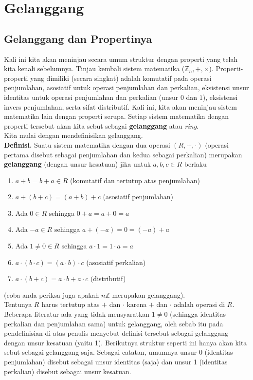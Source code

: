 \chapter{Gelanggang}
	\section{Gelanggang dan Propertinya}
	Kali ini kita akan meninjau secara umum struktur dengan properti yang telah kita kenali sebelumnya. Tinjau kembali sistem matematika ($\mathbb{Z}_n,+,\times$). Properti-properti yang dimiliki (secara singkat) adalah komutatif pada operasi penjumlahan, asosiatif untuk operasi penjumlahan dan perkalian, eksistensi unsur identitas untuk operasi penjumlahan dan perkalian (unsur $0$ dan $1$), eksistensi invers penjumlahan, serta sifat distributif. Kali ini, kita akan meninjau sistem matematika lain dengan properti serupa. Setiap sistem matematika dengan properti tersebut akan kita sebut sebagai \textbf{gelanggang} atau \textit{ring}.
	\\
	
	Kita mulai dengan mendefinisikan gelanggang.
	\\
	
	\textbf{Definisi. }Suatu sistem matematika dengan dua operasi $(R,+,\cdot)$ (operasi pertama disebut sebagai penjumlahan dan kedua sebagai perkalian) merupakan \textbf{gelanggang} (dengan unsur kesatuan) jika untuk $a,b,c \in R$ berlaku
	\begin{enumerate}
		\item $a + b = b + a \in R$ (komutatif dan tertutup atas penjumlahan)
		\item $a + (b + c) = (a + b) + c$ (asosiatif penjumlahan)
		\item Ada $0 \in R$ sehingga $0 + a = a + 0 = a$
		\item Ada $-a \in R$ sehingga $a + (-a) = 0 = (-a) + a$
		\item Ada $1 \ne 0 \in R$ sehingga $a \cdot 1 = 1 \cdot a = a$
		\item $a \cdot (b \cdot c) = (a \cdot b) \cdot c$ (asosiatif perkalian)
		\item $a \cdot (b + c) = a \cdot b + a \cdot c$ (distributif)
	\end{enumerate}
	(coba anda periksa juga apakah $n\mathbb{Z}$ merupakan gelanggang).\\
	
	Tentunya $R$ harus tertutup atas $+$ dan $\cdot$ karena $+$ dan $\cdot$ adalah operasi di $R$. Beberapa literatur ada yang tidak mensyaratkan $1 \ne 0$ (sehingga identitas perkalian dan penjumlahan sama) untuk gelanggang, oleh sebab itu pada pendefinisian di atas penulis menyebut definisi tersebut sebagai gelanggang dengan unsur kesatuan (yaitu 1). Berikutnya struktur seperti ini hanya akan kita sebut sebagai gelanggang saja. Sebagai catatan, umumnya unsur 0 (identitas penjumlahan) disebut sebagai unsur identitas (saja) dan unsur 1 (identitas perkalian) disebut sebagai unsur kesatuan.
	\\
	
